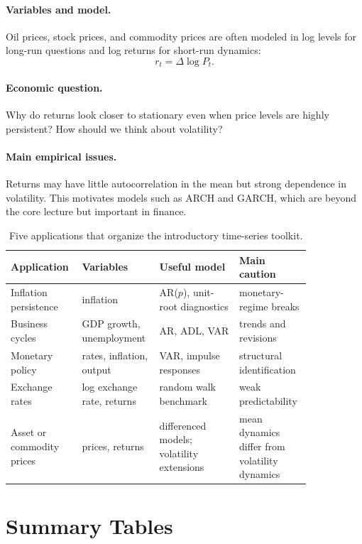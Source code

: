 \paragraph{Variables and model.}
Oil prices, stock prices, and commodity prices are often modeled in log levels for long-run questions and log returns for short-run dynamics:
\[
r_t=\Delta\log P_t.
\]

\paragraph{Economic question.}
Why do returns look closer to stationary even when price levels are highly persistent? How should we think about volatility?

\paragraph{Main empirical issues.}
Returns may have little autocorrelation in the mean but strong dependence in volatility. This motivates models such as ARCH and GARCH, which are beyond the core lecture but important in finance.

\begin{table}[h]
\centering
\small
\begin{tabular}{p{0.18\linewidth}p{0.20\linewidth}p{0.25\linewidth}p{0.21\linewidth}}
\toprule
Application & Variables & Useful model & Main caution \\
\midrule
Inflation persistence & inflation & AR($p$), unit-root diagnostics & monetary-regime breaks \\
Business cycles & GDP growth, unemployment & AR, ADL, VAR & trends and revisions \\
Monetary policy & rates, inflation, output & VAR, impulse responses & structural identification \\
Exchange rates & log exchange rate, returns & random walk benchmark & weak predictability \\
Asset or commodity prices & prices, returns & differenced models; volatility extensions & mean dynamics differ from volatility dynamics \\
\bottomrule
\end{tabular}
\caption{Five applications that organize the introductory time-series toolkit.}
\label{tab:applications}
\end{table}

\section{Summary Tables}

